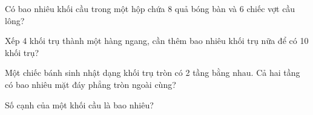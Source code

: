 \begin{ex}
Có bao nhiêu khối cầu trong một hộp chứa 8 quả bóng bàn và 6 chiếc vợt cầu lông?
\end{ex}

\begin{ex}
Xếp 4 khối trụ thành một hàng ngang, cần thêm bao nhiêu khối trụ nữa để có 10 khối trụ?
\end{ex}

\begin{ex}
Một chiếc bánh sinh nhật dạng khối trụ tròn có 2 tầng bằng nhau. Cả hai tầng có bao nhiêu mặt đáy phẳng tròn ngoài cùng?
\end{ex}

\begin{ex}
Số cạnh của một khối cầu là bao nhiêu?
\end{ex}
